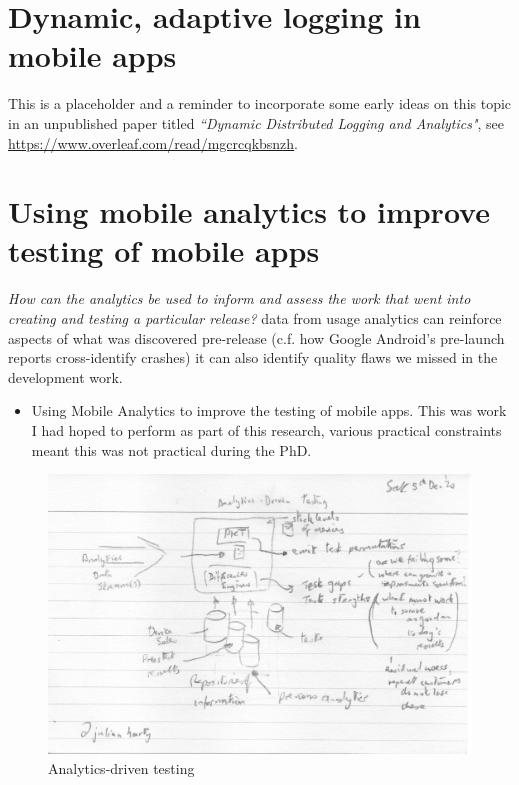 \section{Dynamic, adaptive logging in mobile apps}
This is a placeholder and a reminder to incorporate some early ideas on this topic in an unpublished paper titled \emph{``Dynamic Distributed Logging and Analytics"}, see \url{https://www.overleaf.com/read/mgcrcqkbsnzh}.



\section{Using mobile analytics to improve testing of mobile apps}
\emph{How can the analytics be used to inform and assess the work that went into creating and testing a particular release?} data from usage analytics can reinforce aspects of what was discovered pre-release (c.f. how Google Android's pre-launch reports cross-identify crashes) it can also identify quality flaws we missed in the development work.

\begin{itemize}
    \item Using Mobile Analytics to improve the testing of mobile apps. This was work I had hoped to perform as part of this research, various practical constraints meant this was not practical during the PhD.
\end{itemize}

\begin{figure}[!htbp]
    \centering
    \includegraphics[width=\textwidth]{images/rough-sketches/Analytics-driven-testing-including-PICT.jpeg}
    \caption{Analytics-driven testing}
    \label{fig:roughsketch:analytics-driven-testing-incl-PICT}
\end{figure}

